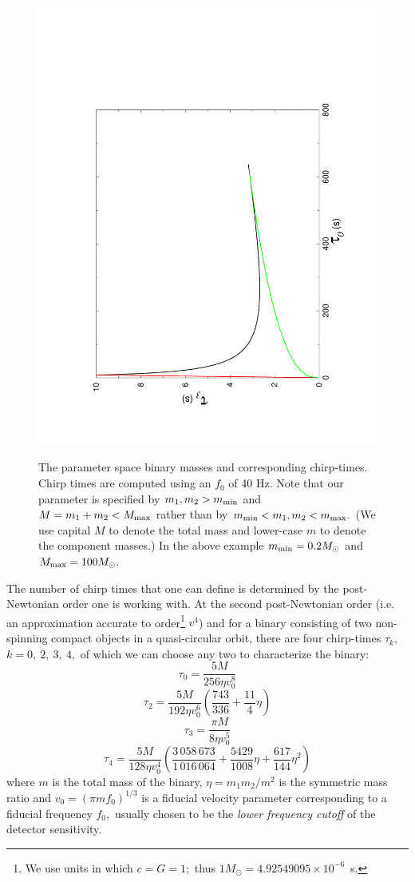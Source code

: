 \begin{figure}[h]
{\noindent\includegraphics[angle=-90,width=0.49\linewidth]{./LALInspiralBankHt0t3}
}
\caption{The parameter space binary masses and corresponding
chirp-times. Chirp times are computed using an $f_0$ of 40 Hz. Note
that our parameter is specified by $m_1, m_2 >m_{\rm min}$ and
$M=m_1+m_2 < M_{\rm max}$ rather than by $m_{\rm min} < m_1,m_2 < m_{\rm max}.$
(We use capital $M$ to denote the total mass and lower-case $m$ to denote
the component masses.) In the above example $m_{\rm min} = 0.2 M_\odot$
and $M_{\rm max} = 100 M_\odot.$}
\label{fig:chirp-times}
\end{figure}

The number of chirp
times that one can define is determined by the post-Newtonian order
one is working with. At the second post-Newtonian order (i.e.
an approximation accurate to order\footnote{We use units in
which $c=G=1;$ thus $1M_\odot=4.92549095 \times 10^{-6}$~s.} $v^4$) and for
a binary consisting of two non-spinning compact objects in a quasi-circular
orbit, there are
four chirp-times $\tau_k,$ $k=0,\ 2,\ 3,\ 4,$ of which we can choose
any two to characterize the binary:
\begin{equation}
\tau_{0} = \frac{5M}{256 \eta v_{0}^{8}}
\end{equation}
\begin{equation}
\tau_{2} = \frac{5M}{192 \eta v_{0}^{6}} \left( \frac{743}{336} + \frac{11}{4} \eta \right)
\end{equation}
\begin{equation}
\tau_{3} = \frac{\pi M}{8 \eta v_{0}^{5}}
\end{equation}
\begin{equation}
\tau_{4} = \frac{5M}{128 \eta v_{0}^4} \left( \frac{3\,058\,673}{1\,016\,064} + \frac{5429}{1008}
\eta +
\frac{617}{144} \eta^{2} \right)
\end{equation}
where $m$ is the total mass of the
binary, $\eta=m_1m_2/m^2$ is the symmetric mass ratio and
$v_0 = (\pi m f_0)^{1/3}$ is a fiducial velocity parameter corresponding
to a fiducial frequency $f_0,$ usually chosen to be the {\it lower
frequency cutoff} of the detector sensitivity.

